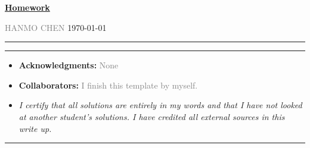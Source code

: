 \documentclass[a4paper]{article}
\begin{document}
\courseheader



\setcounter{hwcnt}{1} %

\begin{center}
  \underline{\bf Homework \thehwcnt} \\
\end{center}
\begin{flushleft}
  \textcolor{gray}{HANMO CHEN}\hfill
  \today
\end{flushleft}
\hrule

\vspace{2em}

\flushleft
\rule{\textwidth}{1pt}
\begin{itemize}
\item {\bf Acknowledgments: \/} 
  \textcolor{gray}{None}

\item {\bf Collaborators: \/}
  \textcolor{gray}{I finish this template by myself.} 
\item  \emph{I certify that all solutions are entirely in my words and that I have not looked at another student's solutions. I have credited all external sources in this write up.}


  \framebox[\linewidth]{\rule{0pt}{10pt}\textcolor{gray}{\large Hanmo Chen}}
\end{itemize}
\rule{\textwidth}{1pt}


\vspace{2em}
\end{document}
